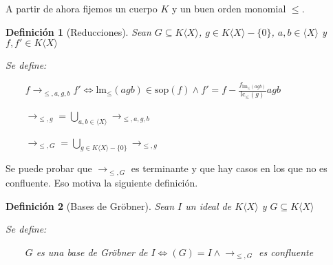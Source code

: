\documentclass{amsbook}
\theoremstyle{customstyle}
\newtheorem{definition}{Definición}[section]
\newcommand{\definición}[2][]{
  \begin{definition}[#1]
  \setlength{\parindent}{2em} %
  #2
  \end{definition}
}
\begin{document}
A partir de ahora fijemos un cuerpo $K$ y un buen orden monomial $≤$.

\definición[Reducciones] {
Sean $G ⊆ K⟨X⟩$, $g ∈ K⟨X⟩ - \{0\}$, $a, b ∈ ⟨X⟩$ y $f, f' ∈ K⟨X⟩$

Se define:

    $f →_{≤, a, g, b} f' ⇔ \text{lm}_≤(agb) ∈ \text{sop}(f) ∧ f' = f - \frac{f_{\text{lm}_≤(agb)}}{\text{lc}_≤(g)}agb$

    $→_{≤, g} = \bigcup_{a, b ∈ ⟨X⟩} →_{≤, a, g, b}$

    $→_{≤, G} = \bigcup_{g ∈ K⟨X⟩ - \{0\}} →_{≤, g}$

}

Se puede probar que $→_{≤, G}$ es terminante y que hay casos en los que no es confluente. Eso motiva la siguiente definición.

\definición[Bases de Gröbner] {
Sean $I$ un ideal de $K⟨X⟩$ y $G ⊆ K⟨X⟩$

Se define:

    $G$ es una base de Gröbner de $I ⇔ (G) = I ∧ →_{≤, G}$ es confluente
}
\end{document}
